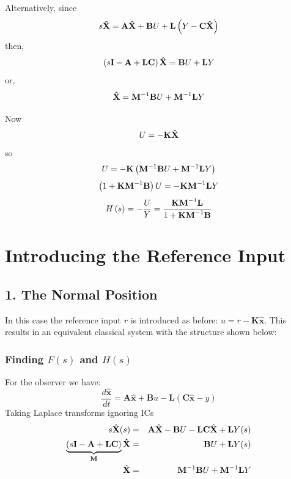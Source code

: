 Alternatively, since
\[
s{\bf{\hat X}} =  {\bf{A\hat X}} + {\bf{B}}U + {\bf{L}}\left( {Y - {\bf{C\hat X}}} \right)
\]
then,
\[
\left( {s{\bf{I}} - {\bf{A}} + {\bf{LC}}} \right){\bf{\hat X}} = {\bf{B}}U + {\bf{L}}Y 
\]
or,
\[
{\bf{\hat X}} = {\bf{M}}^{ - 1} {\bf{B}}U + {\bf{M}}^{ - 1} {\bf{L}}Y
\]

Now
\[
U =  - {\bf{K\hat X}} 
\]
so
\[
U  =   - {\bf{K}}\left( {{\bf{M}}^{ - 1} {\bf{B}}U + {\bf{M}}^{ - 1} {\bf{L}}Y} \right) 
\]
\[
 \left( {1 + {\bf{KM}}^{ - 1} {\bf{B}}} \right)U =  - {\bf{KM}}^{ - 1} {\bf{L}}Y
\]
\[ 
 H\left( s \right) =  - \frac{U}{Y} = \frac{{{\bf{KM}}^{ - 1} {\bf{L}}}}{{1 + {\bf{KM}}^{ - 1} {\bf{B}}}} 
\]




 
\section*{Introducing the Reference Input} %
\label{sec:introducing_the_reference_input}

\subsection*{1. The Normal Position} %
\label{sub:1_the_normal_position}

In this case the reference input $r$ is introduced as before: $u=r-\mathbf{K}\hat{\mathbf{x}}$.  This results in 
an equivalent classical system with the structure shown below:
\begin{center}
\end{center}


\subsubsection*{Finding $F(s)$ and $H(s)$} %
\label{ssub:finding_f_s_and_h_s_}

For the observer we have:
\[
\frac{d\hat{\mathbf{x}}}{dt} = \mathbf{A}\hat{\mathbf{x}}+\mathbf{B}u-\mathbf{L}(\mathbf{C}\hat{\mathbf{x}} - y)
\]
Taking Laplace transforms ignoring ICs
\begin{eqnarray*}
s\hat{\mathbf{X}}(s) & = & \mathbf{A}\hat{\mathbf{X}} - \mathbf{B}U - \mathbf{LC}\hat{\mathbf{X}} + \mathbf{L}Y(s) \\	
\underbrace {(s{\bf{I}} - {\bf{A}} + {\bf{LC}})}_{{\bf{M}}}{\bf{\hat X}} & = & {\bf B}U + {\bf{L}}Y(s) \\
\hat{\mathbf{X}} & = & \mathbf{M}^{-1}\mathbf{B}U + \mathbf{M}^{-1}{\bf{L}}Y
\end{eqnarray*}

